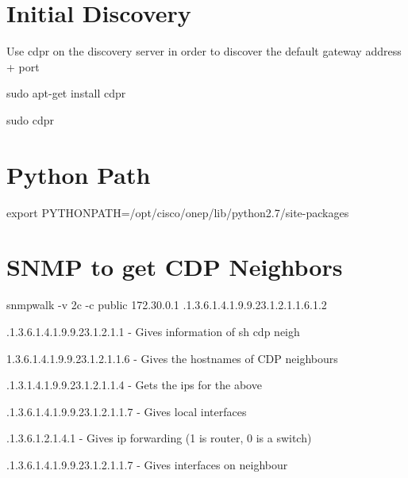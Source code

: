 \documentclass[11pt]{report}
\begin{document}
\section*{Initial Discovery}

Use cdpr on the discovery server in order to discover the default gateway address + port

sudo apt-get install cdpr

sudo cdpr

\section*{Python Path}

 export PYTHONPATH=/opt/cisco/onep/lib/python2.7/site-packages
 
\section*{SNMP to get CDP Neighbors}

snmpwalk -v 2c -c public 172.30.0.1 .1.3.6.1.4.1.9.9.23.1.2.1.1.6.1.2

.1.3.6.1.4.1.9.9.23.1.2.1.1 - Gives information of sh cdp neigh

1.3.6.1.4.1.9.9.23.1.2.1.1.6  - Gives the hostnames of CDP neighbours 

.1.3.1.4.1.9.9.23.1.2.1.1.4 - Gets the ips for the above

.1.3.6.1.4.1.9.9.23.1.2.1.1.7 - Gives local interfaces

.1.3.6.1.2.1.4.1 - Gives ip forwarding (1 is router, 0 is a switch)

.1.3.6.1.4.1.9.9.23.1.2.1.1.7 - Gives interfaces on neighbour
\end{document}
